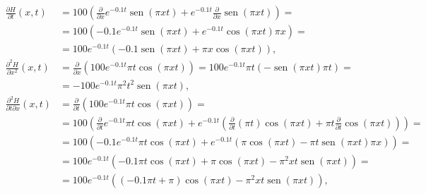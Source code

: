 \documentclass[
  a4paper,
]{scrreport}
\theoremstyle{definition}
\theoremstyle{remark}
\begin{document}
\begin{tcolorbox}
\begin{enumerate}
  \begin{align*}
  \frac{\partial H}{\partial t} (x,t) &= 100\left(\frac{\partial}{\partial x} e^{-0.1 t} \operatorname{sen} (\pi xt) + e^{-0.1t}\frac{\partial}{\partial x}\operatorname{sen}(\pi xt)\right)=\\
  &= 100\left(-0.1e^{-0.1t}\operatorname{sen}(\pi xt) +e^{-0.1t}\cos(\pi xt)\pi x\right) =\\
  &= 100 e^{-0.1t}\left(-0.1 \operatorname{sen}(\pi xt) + \pi x \cos(\pi xt)\right),\\
  \frac{\partial^2 H}{\partial x^2}(x,t) &= \frac{\partial}{\partial x}\left(100e^{-0.1t}\pi t\cos(\pi xt) \right) = 100e^{-0.1t}\pi t(-\operatorname{sen}(\pi xt) \pi t) =\\
  &= -100e^{-0.1t}\pi^2 t^2\operatorname{sen}(\pi xt),\\
  \frac{\partial^2 H}{\partial t\partial x}(x,t) &= \frac{\partial}{\partial t}\left(100e^{-0.1t}\pi t\cos(\pi xt) \right) =\\
  &= 100\left(\frac{\partial}{\partial t}e^{-0.1t}\pi t\cos(\pi xt) + e^{-0.1t}\left(\frac{\partial}{\partial t}(\pi t)\cos(\pi xt) + \pi t \frac{\partial}{\partial t}\cos(\pi xt)\right) \right) =\\
  &= 100\left(-0.1e^{-0.1t}\pi t\cos(\pi xt) + e^{-0.1t}\left(\pi \cos(\pi xt) - \pi t \operatorname{sen}(\pi xt)\pi x\right) \right) =\\
  &= 100e^{-0.1t}\left(-0.1\pi t\cos(\pi xt)+\pi \cos(\pi xt) - \pi^2 xt \operatorname{sen}(\pi xt)\right) = \\
  &= 100e^{-0.1t}\left((-0.1\pi t+\pi)\cos(\pi xt) - \pi^2 xt \operatorname{sen}(\pi xt)\right),\\
  \end{align*}


\end{enumerate}
\end{tcolorbox}
\end{document}
